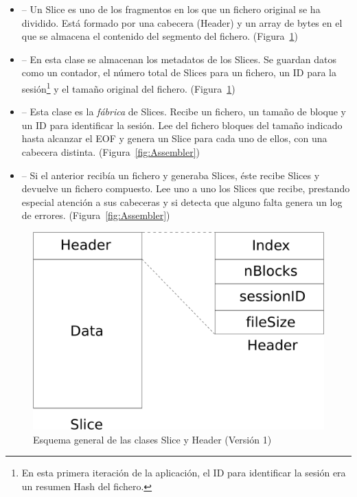 \begin{itemize}
  \item {} -- Un Slice es uno de los fragmentos en los que un
  fichero original se ha dividido. Está formado por una cabecera (Header) y un
  array de bytes en el que se almacena el contenido del segmento del fichero.
  (Figura~\ref{fig:Slice_Header_1})

  \item {} -- En esta clase se almacenan los metadatos de los
  Slices. Se guardan datos como un contador, el número total de Slices
  para un fichero, un ID para la sesión\footnote{En esta primera iteración de la
  aplicación, el ID para identificar la sesión era un resumen Hash del fichero.}
  y el tamaño original del fichero. (Figura~\ref{fig:Slice_Header_1})

  \item {} -- Esta clase es la \emph{fábrica} de Slices. Recibe
  un fichero, un tamaño de bloque y un ID para identificar la sesión. Lee del
  fichero bloques del tamaño indicado hasta alcanzar el EOF y genera un Slice
  para cada uno de ellos, con una cabecera distinta. (Figura~\ref{fig:Assembler})

  \item {} -- Si el anterior recibía un fichero y generaba Slices,
  éste recibe Slices y devuelve un fichero compuesto. Lee uno a uno los Slices
  que recibe, prestando especial atención a sus cabeceras y si detecta que
  alguno falta genera un log de errores. (Figura~\ref{fig:Assembler})
\end{itemize}

\begin{figure}[ht]
  \centering
  \includegraphics[scale=0.4]{Figures/Slice_Header_1}
  \decoRule
  \caption[Slice - Header (Versión 1)]{Esquema general de las clases Slice y Header (Versión 1)}
  \label{fig:Slice_Header_1}
\end{figure}

